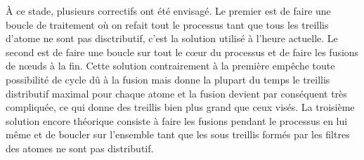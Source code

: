À ce stade, plusieurs correctifs ont été envisagé. Le premier est de faire une boucle de traitement où on refait tout le processus tant que tous les treillis d'atome ne sont pas disctributif, c'est la solution utilisé à l'heure actuelle. Le second est de faire une boucle sur tout le c\oe ur du processus et de faire les fusions de n\oe uds à la fin. Cette solution contrairement à la première empêche toute possibilité de cycle dû à la fusion mais donne la plupart du temps le treillis distributif maximal pour chaque atome et la fusion devient par conséquent très compliquée, ce qui donne des treillis bien plus grand que ceux visés. La troisième solution encore théorique consiste à faire les fusions pendant le processus en lui même et de boucler sur l'ensemble tant que les sous treillis formés par les filtres des atomes ne sont pas distributif.

